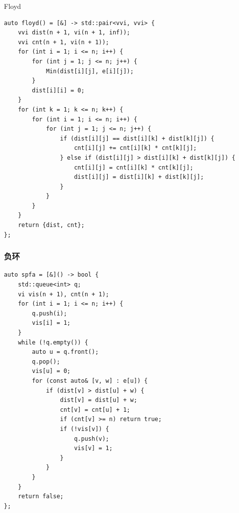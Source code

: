 \documentclass[UTF8, a4paper, titlepage, twoside]{ctexart}
\begin{document}
Floyd
\begin{lstlisting}[style=cpp]
auto floyd() = [&] -> std::pair<vvi, vvi> {
    vvi dist(n + 1, vi(n + 1, inf));
    vvi cnt(n + 1, vi(n + 1));
    for (int i = 1; i <= n; i++) {
        for (int j = 1; j <= n; j++) {
            Min(dist[i][j], e[i][j]);
        }
        dist[i][i] = 0;
    }
    for (int k = 1; k <= n; k++) {
        for (int i = 1; i <= n; i++) {
            for (int j = 1; j <= n; j++) {
                if (dist[i][j] == dist[i][k] + dist[k][j]) {
                    cnt[i][j] += cnt[i][k] * cnt[k][j];
                } else if (dist[i][j] > dist[i][k] + dist[k][j]) {
                    cnt[i][j] = cnt[i][k] * cnt[k][j];
                    dist[i][j] = dist[i][k] + dist[k][j];
                }
            }
        }
    }
    return {dist, cnt};
};
\end{lstlisting}

\subsubsection{ 负环 }
\begin{lstlisting}[style=cpp]
auto spfa = [&]() -> bool {
    std::queue<int> q;
    vi vis(n + 1), cnt(n + 1);
    for (int i = 1; i <= n; i++) {
        q.push(i);
        vis[i] = 1;
    }
    while (!q.empty()) {
        auto u = q.front();
        q.pop();
        vis[u] = 0;
        for (const auto& [v, w] : e[u]) {
            if (dist[v] > dist[u] + w) {
                dist[v] = dist[u] + w;
                cnt[v] = cnt[u] + 1;
                if (cnt[v] >= n) return true;
                if (!vis[v]) {
                    q.push(v);
                    vis[v] = 1;
                }
            }
        }
    }
    return false;
};
\end{lstlisting}
\end{document}
